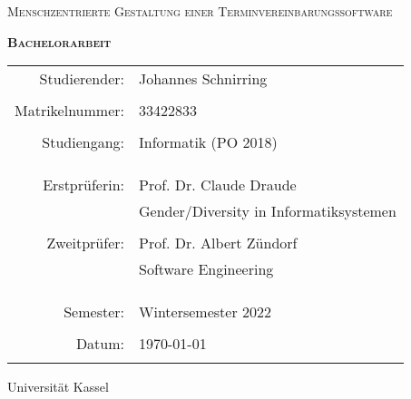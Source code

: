 \documentclass[12pt]{report}
\title{\thesisTitle}
\author{Johannes Schnirring}
\newcommand{\thesisTitle}{Menschzentrierte Gestaltung einer Terminvereinbarungssoftware}
\begin{document}
\pagestyle{fancy}
\renewcommand{\chaptermark}[1]{\markboth{#1}{#1}}
\fancyhead[R]{\thepage}
\fancyhead[L]{\chaptername\ \thechapter\ --\ \leftmark}


\begin{titlepage}
    \centering
    {\scshape\Huge \thesisTitle \par}
    \vspace{1cm}
    {\scshape\Large \textbf{Bachelorarbeit}\par}
    \vspace{1.5cm}
    \begin{tabular}{r l}
        {\Large Studierender:}   & {\Large Johannes Schnirring}                     \\ \\
        {\Large Matrikelnummer:} & {\Large 33422833}                                \\ \\
        {\Large Studiengang:}    & {\Large Informatik (PO 2018) }                   \\ \\ \\ \\
        {\Large Erstprüferin:}   & {\Large Prof. Dr. Claude Draude }                \\
                                 & {\Large Gender/Diversity in Informatiksystemen } \\ \\
        {\Large Zweitprüfer:}    & {\Large Prof. Dr. Albert Zündorf }               \\
                                 & {\Large Software Engineering }                   \\ \\ \\ \\
        {\Large Semester:}       & {\Large Wintersemester 2022}                     \\ \\
        {\Large Datum:}          & {\Large \today}                                  \\ \\
    \end{tabular}
    \vfill
    {\large Universität Kassel}
\end{titlepage}
\end{document}
